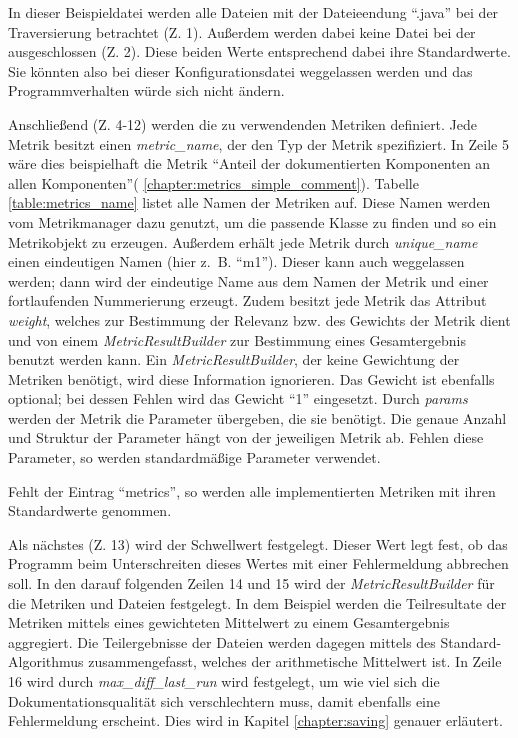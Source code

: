 In dieser Beispieldatei  werden alle Dateien mit der Dateieendung \enquote{.java} bei der Traversierung betrachtet (Z. 1). Außerdem werden dabei keine Datei bei der ausgeschlossen (Z. 2). Diese beiden Werte entsprechend dabei ihre Standardwerte. Sie könnten also bei dieser Konfigurationsdatei weggelassen werden und das Programmverhalten würde sich nicht ändern.

Anschließend (Z. 4-12) werden die zu verwendenden Metriken definiert. Jede Metrik besitzt einen \textit{metric\_name}, der den Typ der Metrik spezifiziert. In Zeile 5 wäre dies beispielhaft die Metrik \enquote{Anteil der dokumentierten Komponenten an allen Komponenten}( \ref{chapter:metrics_simple_comment}). Tabelle \ref{table:metrics_name} listet alle Namen der Metriken auf. Diese Namen werden vom Metrikmanager dazu genutzt, um die passende Klasse zu finden und so ein Metrikobjekt zu erzeugen. Außerdem erhält jede Metrik durch \textit{unique\_name} einen eindeutigen Namen (hier z.~B. \enquote{m1}). Dieser kann auch weggelassen werden; dann wird der eindeutige Name aus dem Namen der Metrik und einer fortlaufenden Nummerierung erzeugt. Zudem besitzt jede Metrik das Attribut \textit{weight}, welches zur Bestimmung der Relevanz bzw. des Gewichts der Metrik dient und von einem \textit{MetricResultBuilder} zur Bestimmung eines Gesamtergebnis benutzt werden kann. Ein \textit{MetricResultBuilder}, der keine Gewichtung der Metriken benötigt, wird diese Information ignorieren. Das Gewicht ist ebenfalls optional; bei dessen Fehlen wird das Gewicht \enquote{1} eingesetzt.  Durch \textit{params}  werden der Metrik die Parameter übergeben, die sie benötigt. Die genaue Anzahl und Struktur der Parameter hängt von der jeweiligen Metrik ab. Fehlen diese Parameter, so werden standardmäßige Parameter verwendet.

Fehlt der Eintrag \enquote{metrics}, so werden alle implementierten Metriken mit ihren Standardwerte genommen.

Als nächstes (Z. 13) wird der Schwellwert festgelegt. Dieser Wert legt fest, ob das Programm beim Unterschreiten dieses Wertes mit einer Fehlermeldung abbrechen soll. In den darauf folgenden Zeilen 14 und 15 wird der \textit{MetricResultBuilder} für die Metriken und Dateien festgelegt. In dem Beispiel werden die Teilresultate der Metriken mittels eines gewichteten Mittelwert zu einem Gesamtergebnis aggregiert. Die Teilergebnisse der Dateien werden dagegen mittels des Standard-Algorithmus zusammengefasst, welches der arithmetische Mittelwert ist.  In Zeile 16 wird durch \textit{ max\_diff\_last\_run } wird festgelegt, um wie viel sich die Dokumentationsqualität sich verschlechtern muss, damit ebenfalls eine Fehlermeldung erscheint. Dies wird in Kapitel \ref{chapter:saving} genauer erläutert.

